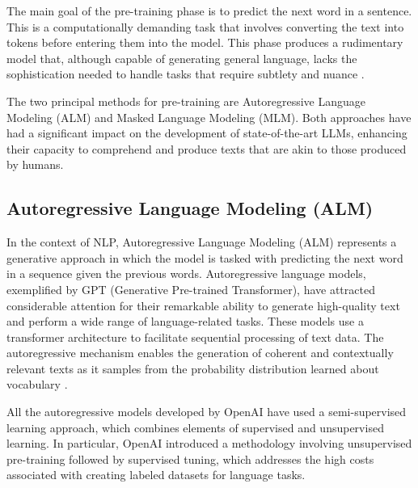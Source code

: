 The main goal of the pre-training phase is to predict the next word in a sentence. This is a computationally demanding task that involves converting the text into tokens before entering them into the model. This phase produces a rudimentary model that, although capable of generating general language, lacks the sophistication needed to handle tasks that require subtlety and nuance \cite{radford2019language}.

The two principal methods for pre-training are Autoregressive Language Modeling (ALM) and Masked Language Modeling (MLM). Both approaches have had a significant impact on the development of state-of-the-art LLMs, enhancing their capacity to comprehend and produce texts that are akin to those produced by humans.

\subsection{Autoregressive Language Modeling (ALM)}

In the context of NLP, Autoregressive Language Modeling (ALM) represents a generative approach in which the model is tasked with predicting the next word in a sequence given the previous words. Autoregressive language models, exemplified by GPT (Generative Pre-trained Transformer), have attracted considerable attention for their remarkable ability to generate high-quality text and perform a wide range of language-related tasks. These models use a transformer architecture to facilitate sequential processing of text data. The autoregressive mechanism enables the generation of coherent and contextually relevant texts as it samples from the probability distribution learned about vocabulary \cite{radford2018improving, radford2019language, achiam2023gpt}.

All the autoregressive models developed by OpenAI have used a semi-supervised learning approach, which combines elements of supervised and unsupervised learning. In particular, OpenAI introduced a methodology involving unsupervised pre-training followed by supervised tuning, which addresses the high costs associated with creating labeled datasets for language tasks.

